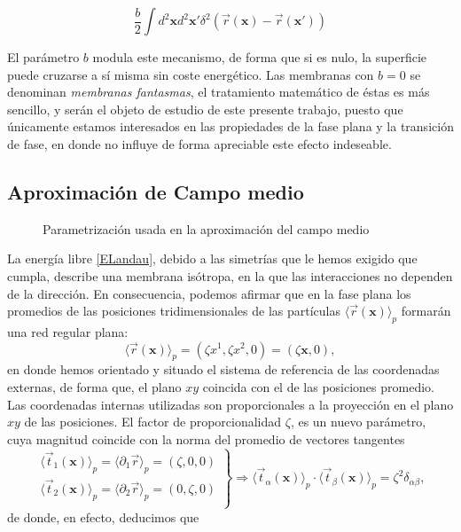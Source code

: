 \begin{equation*}
\frac{b}{2}\int d^2\mathbf{x} d^2\mathbf{x'}
\delta^2(\vec{r}(\mathbf{x})-\vec{r}(\mathbf{x'}))
\end{equation*}

El parámetro $b$ modula este mecanismo, de forma que si es nulo, la superficie
puede cruzarse a sí misma sin coste energético. Las membranas con $b=0$ se
denominan \textit{membranas fantasmas}, el tratamiento matemático de éstas es
 más sencillo, y serán el objeto de estudio de este presente
trabajo, puesto que únicamente estamos interesados en las propiedades de la
fase plana y la transición de fase, en donde no influye de forma apreciable
este efecto indeseable. 

\subsection{Aproximación de Campo medio}

\begin{figure}[h]
\centering
 \resizebox{\columnwidth}{!}{}
\caption{Parametrización usada en la aproximación del campo medio}
\end{figure}

La energía libre \eqref{ELandau}, debido a las simetrías que le hemos exigido
que cumpla, describe una membrana isótropa, en la que las interacciones no
dependen de la dirección. En consecuencia, podemos afirmar que en la fase
plana los promedios de las posiciones tridimensionales de las partículas
$\langle\vec{r}(\mathbf{x})\rangle_{p}$ formarán una red regular plana:  
\begin{equation*}
 \langle\vec{r}(\mathbf{x})\rangle_{p}=(\zeta x^1,\zeta x^2,0)=(\zeta \mathbf{x},0), 
\end{equation*}
en donde hemos orientado y situado el sistema de referencia de las coordenadas
externas, de forma que, el plano $xy$ coincida con el de las
posiciones promedio. Las coordenadas internas utilizadas son 
proporcionales a la proyección en el plano $xy$ de las posiciones. El factor
de proporcionalidad $\zeta$, es un nuevo parámetro, cuya magnitud coincide con
la norma del promedio de  vectores tangentes 
\begin{equation}
 \left.\begin{array}{c}
\langle\vec{t}_{1}(\mathbf{x})\rangle_{p}=\langle\partial_1\vec{r}\rangle_{p}=(\zeta ,0,0)\\
\langle\vec{t}_{2}(\mathbf{x})\rangle_{p}=\langle\partial_2\vec{r}\rangle_{p}=(0,\zeta ,0)\\
 \end{array}\right\}\Rightarrow
\langle\vec{t}_{\alpha}(\mathbf{x})\rangle_{p}\cdot\langle\vec{t}_{\beta}(\mathbf{x})\rangle_{p}=\zeta^2 \delta_{\alpha\beta},
\end{equation}
de donde, en efecto, deducimos que

